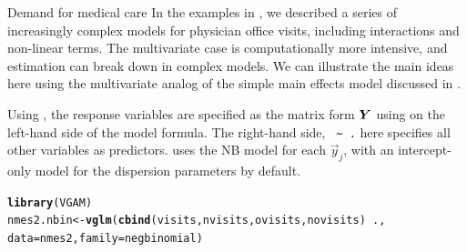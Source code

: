 \documentclass[11pt]{book}\usepackage[]{graphicx}\usepackage[]{color}
\makeatletter
\newcommand{\hlopt}[1]{\textcolor[rgb]{0,0,0}{#1}}%
\newcommand{\hlstd}[1]{\textcolor[rgb]{0.345,0.345,0.345}{#1}}%
\newcommand{\hlkwb}[1]{\textcolor[rgb]{0.69,0.353,0.396}{#1}}%
\newcommand{\hlkwc}[1]{\textcolor[rgb]{0.333,0.667,0.333}{#1}}%
\newcommand{\hlkwd}[1]{\textcolor[rgb]{0.737,0.353,0.396}{\textbf{#1}}}%
\newenvironment{kframe}{%
 \def\at@end@of@kframe{}%
 \ifinner\ifhmode%
  \def\at@end@of@kframe{\end{minipage}}%
  \begin{minipage}{\columnwidth}%
 \fi\fi%
 \def\FrameCommand##1{\hskip\@totalleftmargin \hskip-\fboxsep
 \colorbox{shadecolor}{##1}\hskip-\fboxsep
     \hskip-\linewidth \hskip-\@totalleftmargin \hskip\columnwidth}%
 \MakeFramed {\advance\hsize-\width
   \@totalleftmargin\z@ \linewidth\hsize
   \@setminipage}}%
 {\par\unskip\endMakeFramed%
 \at@end@of@kframe}
\newenvironment{knitrout}{}{} %
\renewenvironment{knitrout}{\small\renewcommand{\baselinestretch}{.85}}{} %
\makeatother
\begin{document}
\begin{Example}[nmes5]{Demand for medical care}
In the examples in , we described a series of increasingly
complex models for physician office visits, including interactions and non-linear terms.
The multivariate case is computationally more intensive, and estimation can break down in
complex models. We can illustrate the main ideas here using the multivariate analog of the
simple main effects model discussed in .

Using , the response variables are specified as the matrix form $\bm{Y}$
using  on the left-hand side of the model formula.  The right-hand side,
\verb| ~ .| here specifies all other variables as predictors.
 uses the NB model for each $\vec{y}_j$, with an intercept-only
model for the dispersion parameters by default.
\begin{knitrout}
\color{fgcolor}\begin{kframe}
\begin{alltt}
\hlkwd{library}\hlstd{(VGAM)}
\hlstd{nmes2.nbin} \hlkwb{<-} \hlkwd{vglm}\hlstd{(}\hlkwd{cbind}\hlstd{(visits, nvisits, ovisits, novisits)} \hlopt{~} \hlstd{.,}
                   \hlkwc{data} \hlstd{= nmes2,} \hlkwc{family} \hlstd{= negbinomial)}
\end{alltt}
\end{kframe}
\end{knitrout}


\end{Example}
\end{document}
